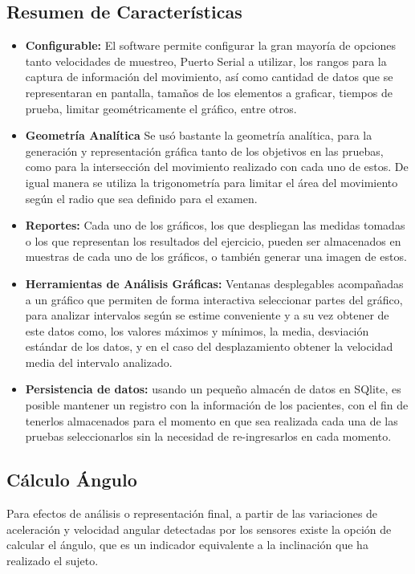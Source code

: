 \documentclass[12pt,a4paper]{article}
\begin{document}
\newpage
\subsection{Resumen de Características}
\begin{itemize}
	\item \textbf{Configurable:} El software permite configurar la gran mayoría de opciones tanto velocidades de muestreo, Puerto Serial a utilizar, los rangos para la captura de información del movimiento, así como cantidad de datos que se representaran en pantalla, tamaños de los elementos a graficar, tiempos de prueba, limitar geométricamente el gráfico, entre otros.
	\item \textbf{Geometría Analítica} Se usó bastante la geometría analítica, para la generación y representación gráfica tanto de los objetivos en las pruebas, como para la intersección del movimiento realizado con cada uno de estos. De igual manera se utiliza la trigonometría para limitar el área del movimiento según el radio que sea definido para el examen.
	\item \textbf{Reportes:} Cada uno de los gráficos, los que despliegan las medidas tomadas o los que representan los resultados del ejercicio, pueden ser almacenados en muestras de cada uno de los gráficos, o también generar una imagen de estos.
	\item \textbf{Herramientas de Análisis Gráficas:} Ventanas desplegables acompañadas a un gráfico que permiten de forma interactiva seleccionar partes del gráfico, para analizar intervalos según se estime conveniente y a su vez obtener de este datos como, los valores máximos y mínimos, la media, desviación estándar de los datos, y en el caso del desplazamiento obtener la velocidad media del intervalo analizado.
	\item \textbf{Persistencia de datos:} usando un pequeño almacén de datos en SQlite, es posible mantener un registro con la información de los pacientes, con el fin de tenerlos almacenados para el momento en que sea realizada cada una de las pruebas seleccionarlos sin la necesidad de re-ingresarlos en cada momento.
\end{itemize}

\newpage
\subsection{Cálculo Ángulo} 
Para efectos de análisis o representación final, a partir de las variaciones de aceleración y velocidad angular detectadas por los sensores existe la opción de calcular el ángulo, que es un indicador equivalente a la inclinación que ha realizado el sujeto.
\end{document}
